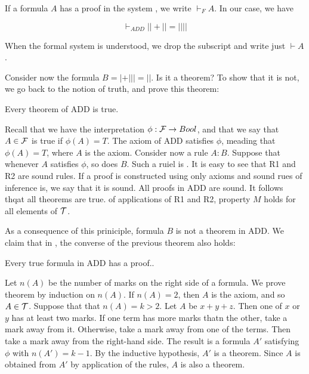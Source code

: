 If a formula $A$ has a proof in the system , we write $\vdash_F A$.  In our case, we have

$$
\vdash_{ADD} || + ||  = ||||
$$

When the formal system is understood, we drop the subscript and write just $\vdash A$.

Consider now the formula $B = | + ||| = ||$.  Is it a theorem? To show that it is not, we go back to the notion of truth, and prove this theorem:

\begin{theorem}
\label{add:soundness}
Every theorem of ADD is true.
\end{theorem}



 Recall that we have the interpretation $\phi: \mathcal{F} \to Bool$, and that we say that $A \in \mathcal{F}$ is true if $\phi(A) = T$. The axiom of ADD satisfies $\phi$, meading that $\phi(A) = T$, where $A$ is the axiom.   Consider now a rule $A : B$. Suppose that whenever $A$ satisfies $\phi$, so does $B$.  Such a ruiel is .  It is easy to see that R1 and R2 are sound rules.  If a proof is constructed using only axioms and sound rues of inference is, we say that it is sound.
All proofs in ADD are sound. It follows thqat all theorems are true. of applications of R1 and R2, property $M$ holds for all elements of $\mathcal{T}$. 

As a consequence of this priniciple, formula $B$ is not a theorem in ADD.
We claim that in , the converse of the previous theorem also holds:

\begin{theorem}
\label{add:completeness}
Every true formula in ADD has a proof..  
\end{theorem}

 Let $n(A)$ be the number of marks on the right side of a formula. We prove theorem by induction on $n(A)$.  If $n(A) = 2$, then $A$ is the axiom, and so $A \in \mathcal{T}$.  Suppose that that $n(A) = k > 2$.  Let $A$ be $x + y + z$.  Then one of $x$ or $y$ has at least two marks.  If one term has more marks thatn the other, take a mark away from it.  Otherwise, take a mark away from one of the terms.  Then take a mark away from the right-hand side.  The result is a formula $A'$ satisfying $\phi$ with $n(A') = k - 1$. By the inductive hypothesis, $A'$ is a theorem.  Since $A$ is obtained from $A'$ by application of the rules, $A$ is also a theorem. 


